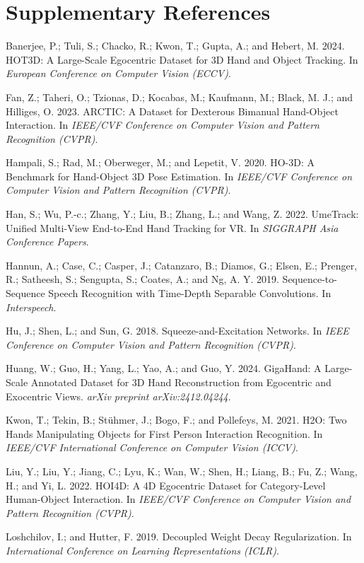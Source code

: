 \section*{Supplementary References}
\begingroup
\footnotesize
\setlength{\parindent}{0pt}
\setlength{\parskip}{3pt}

Banerjee, P.; Tuli, S.; Chacko, R.; Kwon, T.; Gupta, A.; and Hebert, M.
2024. HOT3D: A Large-Scale Egocentric Dataset for 3D Hand and Object
Tracking. In \emph{European Conference on Computer Vision (ECCV)}.

Fan, Z.; Taheri, O.; Tzionas, D.; Kocabas, M.; Kaufmann, M.; Black, M. J.;
and Hilliges, O. 2023. ARCTIC: A Dataset for Dexterous Bimanual Hand-Object
Interaction. In \emph{IEEE/CVF Conference on Computer Vision and Pattern
Recognition (CVPR)}.

Hampali, S.; Rad, M.; Oberweger, M.; and Lepetit, V. 2020. HO-3D: A
Benchmark for Hand-Object 3D Pose Estimation. In \emph{IEEE/CVF Conference
on Computer Vision and Pattern Recognition (CVPR)}.

Han, S.; Wu, P.-c.; Zhang, Y.; Liu, B.; Zhang, L.; and Wang, Z. 2022.
UmeTrack: Unified Multi-View End-to-End Hand Tracking for VR. In
\emph{SIGGRAPH Asia Conference Papers}.

Hannun, A.; Case, C.; Casper, J.; Catanzaro, B.; Diamos, G.; Elsen, E.;
Prenger, R.; Satheesh, S.; Sengupta, S.; Coates, A.; and Ng, A. Y. 2019.
Sequence-to-Sequence Speech Recognition with Time-Depth Separable
Convolutions. In \emph{Interspeech}.

Hu, J.; Shen, L.; and Sun, G. 2018. Squeeze-and-Excitation Networks. In
\emph{IEEE Conference on Computer Vision and Pattern Recognition (CVPR)}.

Huang, W.; Guo, H.; Yang, L.; Yao, A.; and Guo, Y. 2024. GigaHand: A
Large-Scale Annotated Dataset for 3D Hand Reconstruction from Egocentric and
Exocentric Views. \emph{arXiv preprint arXiv:2412.04244}.

Kwon, T.; Tekin, B.; St\"uhmer, J.; Bogo, F.; and Pollefeys, M. 2021. H2O:
Two Hands Manipulating Objects for First Person Interaction Recognition. In
\emph{IEEE/CVF International Conference on Computer Vision (ICCV)}.

Liu, Y.; Liu, Y.; Jiang, C.; Lyu, K.; Wan, W.; Shen, H.; Liang, B.; Fu, Z.;
Wang, H.; and Yi, L. 2022. HOI4D: A 4D Egocentric Dataset for Category-Level
Human-Object Interaction. In \emph{IEEE/CVF Conference on Computer Vision
and Pattern Recognition (CVPR)}.

Loshchilov, I.; and Hutter, F. 2019. Decoupled Weight Decay Regularization.
In \emph{International Conference on Learning Representations (ICLR)}.

